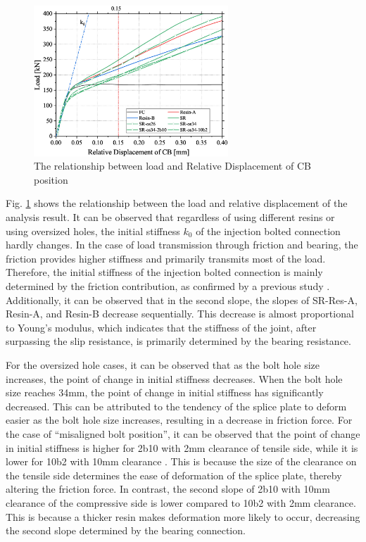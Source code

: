 \begin{figure}[htbp]
    \centering
    \includegraphics[width=0.65\textwidth]{imgs/app3/RD-RIBJ.eps}
    \caption{The relationship between load and Relative Displacement of CB position}
    \label{fig-RD-RIBJ}
\end{figure}

Fig. \ref{fig-RD-RIBJ} shows the relationship between the load and relative displacement of the analysis result. It can be observed that regardless of using different resins or using oversized holes, the initial stiffness $k_0$ of the injection bolted connection hardly changes. In the case of load transmission through friction and bearing, the friction provides higher stiffness and primarily transmits most of the load. Therefore, the initial stiffness of the injection bolted connection is mainly determined by the friction contribution, as confirmed by a previous study \cite{Chen2023MechanicalConnections}. Additionally, it can be observed that in the second slope, the slopes of SR-Res-A, Resin-A, and Resin-B decrease sequentially. This decrease is almost proportional to Young’s modulus, which indicates that the stiffness of the joint, after surpassing the slip resistance, is primarily determined by the bearing resistance.

For the oversized hole cases, it can be observed that as the bolt hole size increases, the point of change in initial stiffness decreases. When the bolt hole size reaches 34mm, the point of change in initial stiffness has significantly decreased. This can be attributed to the tendency of the splice plate to deform easier as the bolt hole size increases, resulting in a decrease in friction force.
For the case of “misaligned bolt position”, it can be observed that the point of change in initial stiffness is higher for 2b10 with 2mm clearance of tensile side, while it is lower for 10b2 with 10mm clearance  . This is because the size of the clearance on the tensile side determines the ease of deformation of the splice plate, thereby altering the friction force. In contrast, the second slope of 2b10 with 10mm clearance of the compressive side is lower compared to 10b2 with 2mm clearance. This is because a thicker resin makes deformation more likely to occur, decreasing the second slope determined by the bearing connection.

